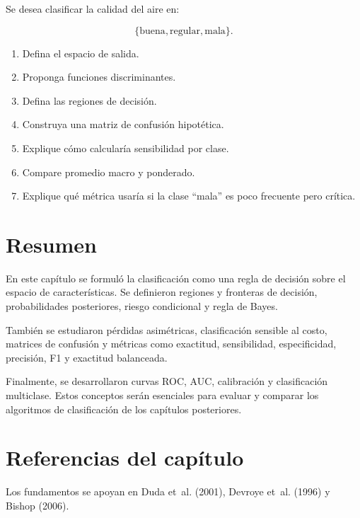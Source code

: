 \documentclass[
  spanish,
  10.5pt,
  letterpaper,
  DIV=11,
  numbers=noendperiod,
  oneside,
  open=any]{scrreprt}
\providecommand{\tightlist}{%
  \setlength{\itemsep}{0pt}\setlength{\parskip}{0pt}}
\theoremstyle{definition}
\theoremstyle{definition}
\theoremstyle{plain}
\theoremstyle{remark}
\begin{document}

Se desea clasificar la calidad del aire en:

\[
\{
\text{buena},
\text{regular},
\text{mala}
\}.
\]

\begin{enumerate}
\def\labelenumi{\arabic{enumi}.}
\tightlist
\item
  Defina el espacio de salida.
\item
  Proponga funciones discriminantes.
\item
  Defina las regiones de decisión.
\item
  Construya una matriz de confusión hipotética.
\item
  Explique cómo calcularía sensibilidad por clase.
\item
  Compare promedio macro y ponderado.
\item
  Explique qué métrica usaría si la clase ``mala'' es poco frecuente
  pero crítica.
\end{enumerate}

\section*{Resumen}\label{resumen-5}


En este capítulo se formuló la clasificación como una regla de decisión
sobre el espacio de características. Se definieron regiones y fronteras
de decisión, probabilidades posteriores, riesgo condicional y regla de
Bayes.

También se estudiaron pérdidas asimétricas, clasificación sensible al
costo, matrices de confusión y métricas como exactitud, sensibilidad,
especificidad, precisión, F1 y exactitud balanceada.

Finalmente, se desarrollaron curvas ROC, AUC, calibración y
clasificación multiclase. Estos conceptos serán esenciales para evaluar
y comparar los algoritmos de clasificación de los capítulos posteriores.

\section*{Referencias del capítulo}\label{referencias-del-capuxedtulo-5}


Los fundamentos se apoyan en Duda et~al. (2001), Devroye et~al. (1996) y
Bishop (2006).
\end{document}
